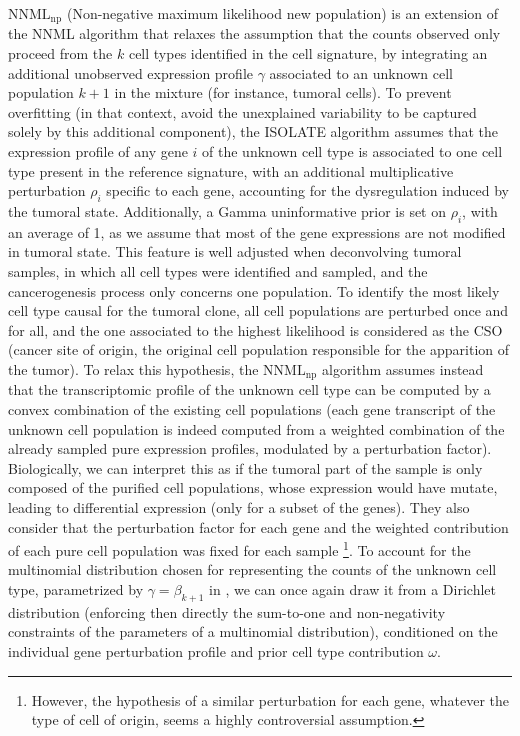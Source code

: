 \(\text{NNML}_\text{np}\) (Non-negative maximum likelihood new
population) is an extension of the NNML algorithm that relaxes the
assumption that the counts observed only proceed from the \(k\) cell
types identified in the cell signature, by integrating an additional
unobserved expression profile \(\gamma\) associated to an unknown cell
population \(k+1\) in the mixture (for instance, tumoral cells). To
prevent overfitting (in that context, avoid the unexplained variability
to be captured solely by this additional component), the ISOLATE
algorithm \autocite{quon_morris09}
assumes that the expression profile of any gene \(i\) of the unknown
cell type is associated to one cell type present in the reference
signature, with an additional multiplicative perturbation \(\rho_i\)
specific to each gene, accounting for the dysregulation induced by the
tumoral state. Additionally, a Gamma uninformative prior is set on
\(\rho_i\), with an average of 1, as we assume that most of the gene
expressions are not modified in tumoral state. This feature is well
adjusted when deconvolving tumoral samples, in which all cell types were
identified and sampled, and the cancerogenesis process only concerns one
population. To identify the most likely cell type causal for the tumoral
clone, all cell populations are perturbed once and for all, and the one
associated to the highest likelihood is considered as the CSO (cancer
site of origin, the original cell population responsible for the
apparition of the tumor). To relax this hypothesis, the
\(\text{NNML}_\text{np}\) algorithm
\autocite{qiao_etal12} assumes instead
that the transcriptomic profile of the unknown cell type can be computed
by a convex combination of the existing cell populations (each gene
transcript of the unknown cell population is indeed computed from a
weighted combination of the already sampled pure expression profiles,
modulated by a perturbation factor). Biologically, we can interpret this
as if the tumoral part of the sample is only composed of the purified
cell populations, whose expression would have mutate, leading to
differential expression (only for a subset of the genes). They also consider that the perturbation factor for each gene and the
weighted contribution of each pure cell population was fixed for each
sample \footnote{However, the hypothesis of a similar perturbation for each gene, whatever the type of cell of origin, seems a highly controversial assumption.}. To account for the multinomial distribution chosen for
representing the counts of the unknown cell type, parametrized by
\(\gamma = \beta_{k+1}\) in \autocite{qiao_etal12}, we can once again draw it from a Dirichlet
distribution (enforcing then directly the sum-to-one and non-negativity
constraints of the parameters of a multinomial distribution),
conditioned on the individual gene perturbation profile and prior cell
type contribution \(\omega\).

